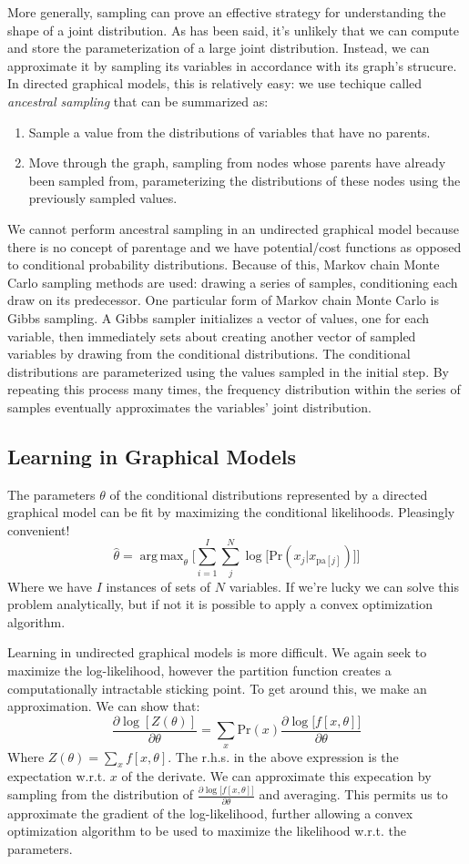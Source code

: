 \documentclass[idxtotoc,hyperref,openany]{labbook} %
\DeclareMathOperator*{\argmax}{arg\,max}
\begin{document}
More generally, sampling can prove an effective strategy for understanding the shape of a joint distribution. As has been said, it's unlikely that we can compute and store the parameterization of a large joint distribution. Instead, we can approximate it by sampling its variables in accordance with its graph's strucure. In directed graphical models, this is relatively easy: we use techique called \emph{ancestral sampling} that can be summarized as:
\begin{enumerate}
\item Sample a value from the distributions of variables that have no parents.
\item Move through the graph, sampling from nodes whose parents have already been sampled from, parameterizing the distributions of these nodes using the previously sampled values.
\end{enumerate}
We cannot perform ancestral sampling in an undirected graphical model because there is no concept of parentage and we have potential/cost functions as opposed to conditional probability distributions. Because of this, Markov chain Monte Carlo sampling methods are used: drawing a series of samples, conditioning each draw on its predecessor. One particular form of Markov chain Monte Carlo is Gibbs sampling. A Gibbs sampler initializes a vector of values, one for each variable, then immediately sets about creating another vector of sampled variables by drawing from the conditional distributions. The conditional distributions are parameterized using the values sampled in the initial step. By repeating this process many times, the frequency distribution within the series of samples eventually approximates the variables' joint distribution.

\subsection*{Learning in Graphical Models}
The parameters $\theta$ of the conditional distributions represented by a directed graphical model can be fit by maximizing the conditional likelihoods. Pleasingly convenient!
\[
	\hat{\theta} = \argmax_{\theta}\Big[\sum_{i = 1}^{I}\sum_{j}^N \log\big[\text{Pr}(x_j | x_{\text{pa}[j]})\big]\Big]
\]
Where we have $I$ instances of sets of $N$ variables. If we're lucky we can solve this problem analytically, but if not it is possible to apply a convex optimization algorithm.

Learning in undirected graphical models is more difficult. We again seek to maximize the log-likelihood, however the partition function creates a computationally intractable sticking point. To get around this, we make an approximation. We can show that:
\[
	\frac{\partial \log[Z(\theta)]}{\partial \theta} = \sum_{x}\text{Pr}(x)\frac{\partial \log \big[f[x, \theta]\big]}{\partial \theta}
\]
Where $Z(\theta) = \sum_x f[x, \theta]$. The r.h.s. in the above expression is the expectation w.r.t. $x$ of the derivate. We can approximate this expecation by sampling from the distribution of $\frac{\partial \log \big[f[x, \theta]\big]}{\partial \theta}$ and averaging. This permits us to approximate the gradient of the log-likelihood, further allowing a convex optimization algorithm to be used to maximize the likelihood w.r.t. the parameters.
\end{document}
